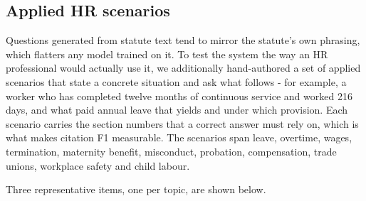 \documentclass[11pt,a4paper]{article}
\begin{document}
\subsection{Applied HR scenarios}
Questions generated from statute text tend to mirror the statute's own phrasing, which flatters any model trained on it. To test the system the way an HR professional would actually use it, we additionally hand-authored a set of applied scenarios that state a concrete situation and ask what follows - for example, a worker who has completed twelve months of continuous service and worked 216 days, and what paid annual leave that yields and under which provision. Each scenario carries the section numbers that a correct answer must rely on, which is what makes citation F1 measurable. The scenarios span leave, overtime, wages, termination, maternity benefit, misconduct, probation, compensation, trade unions, workplace safety and child labour.
\begin{table}[htbp]
\centering
\renewcommand{\arraystretch}{1.15}
\caption{Validation of the hand-authored scenario gold standard against the text of the Act.}
\label{tab:scenverify}
\small
{}
\end{table}

Three representative items, one per topic, are shown below.
\end{document}
